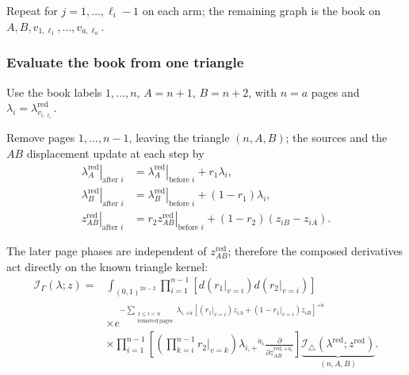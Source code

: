 \documentclass[11pt]{article}
\numberwithin{equation}{section}
\numberwithin{figure}{section}
\numberwithin{table}{section}
\begin{document}
Repeat for $j=1,\ldots,\ell_i-1$ on each arm; the remaining graph is the book on $A,B,v_{1,\ell_1},\ldots,v_{a,\ell_a}$.

\subsubsection{Evaluate the book from one triangle}\label{sec-book-jacobian}

Use the book labels $1,\ldots,n$, $A=n+1$, $B=n+2$, with $n=a$ pages and $\lambda_i=\lambda_{v_{i,\ell_i}}^{\mathrm{red}}$.

Remove pages $1,\ldots,n-1$, leaving the triangle $(n,A,B)$; the sources and the $AB$ displacement update at each step by
\begin{equation*}
\begin{aligned}
\left.\lambda_A^{\mathrm{red}}\right|_{\text{after }i}
&=\left.\lambda_A^{\mathrm{red}}\right|_{\text{before }i}+r_1\lambda_i,\\
\left.\lambda_B^{\mathrm{red}}\right|_{\text{after }i}
&=\left.\lambda_B^{\mathrm{red}}\right|_{\text{before }i}+(1-r_1)\lambda_i,\\
\left.z_{AB}^{\mathrm{red}}\right|_{\text{after }i}
&=r_2\left.z_{AB}^{\mathrm{red}}\right|_{\text{before }i}
+(1-r_2)(z_{iB}-z_{iA}).
\end{aligned}
\end{equation*}

The later page phases are independent of $z_{AB}^{\mathrm{red}}$; therefore the composed derivatives act directly on the known triangle kernel:
\begin{equation}\label{eq-B-book-full-kernel}
\begin{aligned}
    \mathcal I_\Gamma(\lambda;z)
    ={}&\int_{(0,1)^{2n-2}}
    \prod_{i=1}^{n-1}\left[d\!\left(\left.r_1\right|_{v=i}\right)
     d\!\left(\left.r_2\right|_{v=i}\right)\right]\\
    &\times e^{-\sum_{\substack{1\le i<n\\\mathrm{removed\ pages}}}
    \lambda_{i,+\dot a}
    [(\left.r_1\right|_{v=i})z_{iA}+(1-\left.r_1\right|_{v=i})z_{iB}]^{+\dot a}}\\
    &\times\prod_{i=1}^{n-1}\left[
    \left(\prod_{k=i}^{n-1}\left.r_2\right|_{v=k}\right)
    \lambda_{i,+}{}^{\dot a_i}
    \frac{\partial}{\partial z_{AB}^{\mathrm{red},+\dot a_i}}
    \right]
    \underbrace{\mathcal I_\triangle(\lambda^{\mathrm{red}};z^{\mathrm{red}})}_{(n,A,B)}.
    \end{aligned}
\end{equation}
\end{document}
